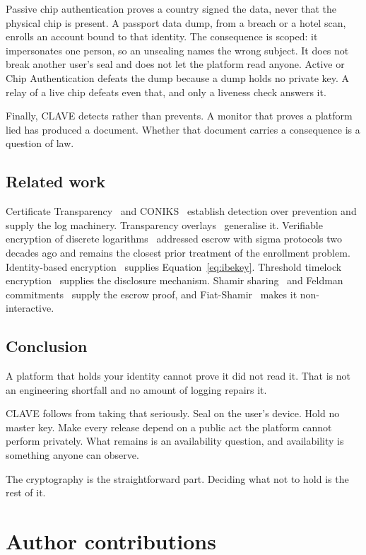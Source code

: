 \documentclass[11pt,a4paper]{article}
\begin{document}
Passive chip authentication proves a country signed the data, never that the
physical chip is present. A passport data dump, from a breach or a hotel scan,
enrolls an account bound to that identity. The consequence is scoped: it
impersonates one person, so an unsealing names the wrong subject. It does not
break another user's seal and does not let the platform read anyone. Active or
Chip Authentication defeats the dump because a dump holds no private key. A
relay of a live chip defeats even that, and only a liveness check answers it.

Finally, CLAVE detects rather than prevents. A monitor that proves a platform
lied has produced a document. Whether that document carries a consequence is a
question of law.

\subsection{Related work}

Certificate Transparency~\cite{rfc9162} and CONIKS~\cite{coniks} establish
detection over prevention and supply the log machinery. Transparency
overlays~\cite{overlays} generalise it. Verifiable encryption of discrete
logarithms~\cite{camenisch} addressed escrow with sigma protocols two decades ago
and remains the closest prior treatment of the enrollment problem.
Identity-based encryption~\cite{bf} supplies Equation~\ref{eq:ibekey}. Threshold
timelock encryption~\cite{tlock} supplies the disclosure mechanism. Shamir
sharing~\cite{shamir} and Feldman commitments~\cite{feldman} supply the escrow
proof, and Fiat-Shamir~\cite{fiatshamir} makes it non-interactive.

\subsection{Conclusion}

A platform that holds your identity cannot prove it did not read it. That is not
an engineering shortfall and no amount of logging repairs it.

CLAVE follows from taking that seriously. Seal on the user's device. Hold no
master key. Make every release depend on a public act the platform cannot perform
privately. What remains is an availability question, and availability is
something anyone can observe.

The cryptography is the straightforward part. Deciding what not to hold is the
rest of it.

\section*{Author contributions}
\end{document}
